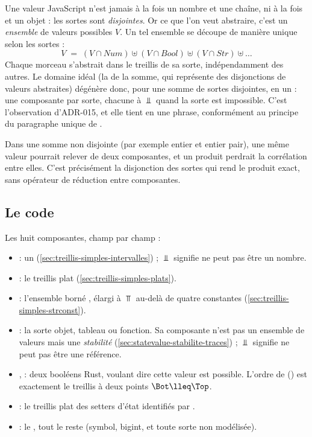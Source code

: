 Une valeur JavaScript n'est jamais à la fois un nombre et une chaîne, ni à
la fois  et un objet : les sortes sont \emph{disjointes}. Or ce
que l'on veut abstraire, c'est un \emph{ensemble} de valeurs possibles
$V$. Un tel ensemble se découpe de manière unique selon les sortes :
\[
  V \;=\; (V \cap \mathit{Num}) \uplus (V \cap \mathit{Bool}) \uplus
  (V \cap \mathit{Str}) \uplus \dots
\]
Chaque morceau s'abstrait dans le treillis de sa sorte, indépendamment des
autres. Le domaine idéal (la  de la somme, qui
représente des disjonctions de valeurs abstraites) dégénère donc, pour une
somme de sortes disjointes, en un  : une composante
par sorte, chacune à $\Bot$ quand la sorte est impossible. C'est
l'observation d'ADR-015, et elle tient en une phrase, conformément au
principe du paragraphe unique de .

\begin{remarque}
Dans une somme non disjointe (par exemple \og entier\fg{} et \og entier
pair\fg{}), une même valeur pourrait relever de deux composantes, et un
produit perdrait la corrélation entre elles. C'est précisément la
disjonction des sortes qui rend le produit exact, sans opérateur de
réduction entre composantes.
\end{remarque}

\subsection{Le code}


Les huit composantes, champ par champ :
\begin{itemize}
  \item {} : un  (\cref{sec:treillis-simples-intervalles}) ;
    $\Bot$ signifie \og ne peut pas être un nombre\fg{}.
  \item {} : le treillis plat 
    (\cref{sec:treillis-simples-plats}).
  \item {} : l'ensemble borné , élargi à $\Top$ au-delà de
    quatre constantes (\cref{sec:treillis-simples-strconst}).
  \item {} : la sorte \og objet, tableau ou fonction\fg{}. Sa
    composante n'est pas un ensemble de valeurs mais une
    \emph{stabilité} (\cref{sec:statevalue-stabilite-traces}) ; $\Bot$
    signifie \og ne peut pas être une référence\fg{}.
  \item {},  : deux booléens Rust,  voulant
    dire \og cette valeur est possible\fg{}. L'ordre de 
    () est exactement le treillis à deux points
    $\Bot \lleq \Top$.
  \item {} : le treillis plat  des setters
    d'état identifiés par .
  \item {} : le , \og tout le reste\fg{} (symbol,
    bigint, et toute sorte non modélisée).
\end{itemize}

